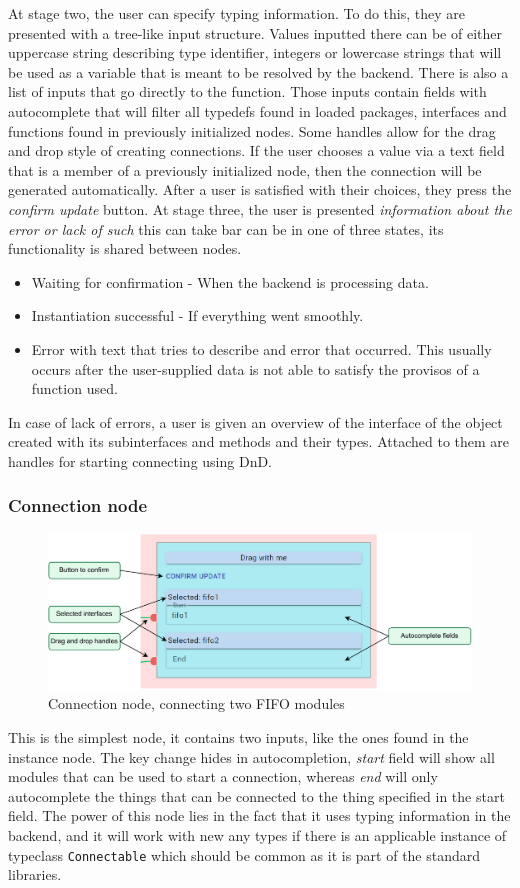 \documentclass[12pt]{report}
\begin{document}
At stage two, the user can specify typing information. To do this, they are presented with a tree-like input structure. Values inputted there can be of either uppercase string describing type identifier, integers or lowercase strings that will be used as a variable that is meant to be resolved by the backend. There is also a list of inputs that go directly to the function. Those inputs contain fields with autocomplete that will filter all typedefs found in loaded packages, interfaces and functions found in previously initialized nodes. Some handles allow for the drag and drop style of creating connections. If the user chooses a value via a text field that is a member of a previously initialized node, then the connection will be generated automatically. 
After a user is satisfied with their choices, they press the \emph{confirm update} button. 
At stage three, the user is presented \emph{information about the error or lack of such} this can take bar can be in one of three states, its functionality is shared between nodes. 
\begin{itemize} 
   \item Waiting for confirmation - When the backend is processing data. 
   \item Instantiation successful - If everything went smoothly. 
   \item Error with text that tries to describe and error that occurred. This usually occurs after the user-supplied data is not able to satisfy the provisos of a function used. 
\end{itemize}  
In case of lack of errors, a user is given an overview of the interface of the object created with its subinterfaces and methods and their types. Attached to them are handles for starting connecting using DnD. 
\newpage
\subsubsection{Connection node}
\begin{figure}[!h]
\centering
\includegraphics[width=1\columnwidth]{pdfExports/LargeMap-ConnectionNode.drawio.pdf}
\caption{Connection node, connecting two FIFO modules}
\end{figure}
This is the simplest node, it contains two inputs, like the ones found in the instance node. The key change hides in autocompletion, \emph{start} field will show all modules that can be used to start a connection, whereas \emph{end} will only autocomplete the things that can be connected to the thing specified in the start field. The power of this node lies in the fact that it uses typing information in the backend, and it will work with new any types if there is an applicable instance of typeclass \verb!Connectable! which should be common as it is part of the standard libraries.
\end{document}
